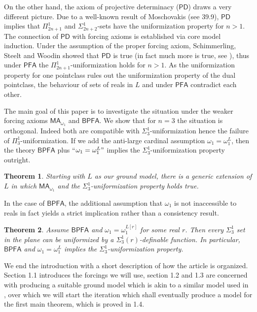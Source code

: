 \documentclass[a4paper,12pt]{article}
\newtheorem*{theorem*}{Theorem}
\newcommand{\PFA}{\mathsf{PFA}}
\newcommand{\BPFA}{\mathsf{BPFA}}
\newcommand{\MA}{\mathsf{MA}_{\omega_1}}
\newcommand{\PD}{\mathsf{PD}}
\begin{document}
On the other hand, the axiom of projective determinacy ($\PD$) draws a very different picture.  Due to a well-known result of Moschovakis (see \cite{Kechris} 39.9), $\PD$ implies that $\Pi^1_{2n+1}$ and $\Sigma^1_{2n+2}$-sets have the uniformization property for $n >1$.
The connection of $\PD$ with forcing axioms is established via core model induction. Under the assumption of the proper forcing axiom, Schimmerling, Steelt and Woodin showed  that $\PD$ is true (in fact much more is true, see \cite{Steel}), thus under $\PFA$ the $\Pi^1_{2n+1}$-uniformization holds for $n>1$. 
As the uniformization property for one pointclass rules out the uniformization property of the dual pointclass, the behaviour of sets of reals in $L$ and under $\PFA$ contradict each other.

The main goal of this paper is to investigate the situation under the weaker forcing axioms $\MA$ and $\BPFA$. We show that for $n=3$ the situation is orthogonal. Indeed both are compatible with $\Sigma^1_3$-uniformization hence the failure of $\Pi^1_{3}$-uniformization. If we add the anti-large cardinal assumption $\omega_1=\omega_1^L$, then the theory $\BPFA$ plus “$\omega_1=\omega_1^L"$ implies the $\Sigma^1_3$-uniformization property outright.

\begin{theorem*}
Starting with $L$ as our ground model, there is a generic extension of $L$ in which $\MA$ and the $\Sigma^1_3$-uniformization property holds true.
\end{theorem*}

In the case of $\BPFA$, the additional assumption that $\omega_1$ is not inaccessible to reals in fact yields a strict implication rather than a consistency result.
\begin{theorem*}
Assume $\BPFA$ and $\omega_1=\omega_1^{L[r]}$ for some real $r$. Then every $\Sigma^1_3$ set in the plane can be uniformized by a $\Sigma^1_3(r)$-definable function. In particular, $\BPFA$ and $\omega_1=\omega_1^L$ implies the $\Sigma^1_3$-uniformization property.
\end{theorem*} 

We end the introduction with a short description of how the article is organized. Section 1.1 introduces the forcings we will use, section 1.2 and 1.3 are concerned with producing a suitable ground model which is akin to a similar model used in \cite{Ho2}, over which we will start the iteration which shall eventually produce a model for the first main theorem, which is proved in 1.4.
\end{document}
